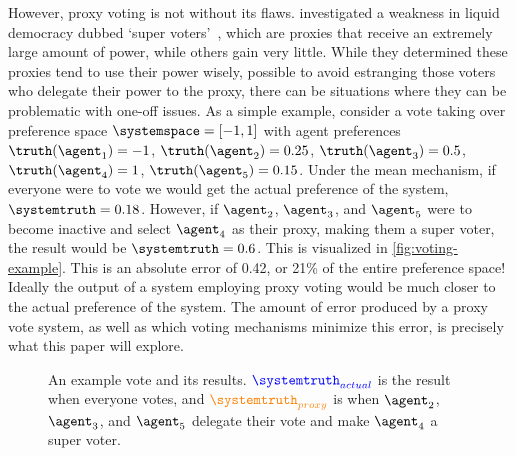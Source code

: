 However, proxy voting is not without its flaws.
 investigated a weakness in liquid democracy dubbed
`super voters'~\cite{Kling2015}, which are proxies that receive an extremely large
amount of power, while others gain very little.
While they determined these proxies tend to use their power wisely, possible  to avoid
estranging those voters who delegate their power to the proxy, there can be
situations where they  can be problematic with one-off issues.
As a simple example, consider a vote taking over preference
space $\systemspace = [-1, 1]$ with agent preferences $\truthof{\agent_1} = -1$,
$\truthof{\agent_2} = 0.25$, $\truthof{\agent_3} = 0.5$, $\truthof{\agent_4} = 1$,
$\truthof{\agent_5} = 0.15$.
Under the mean mechanism, if everyone were to vote
we would get the actual preference of the system, $\systemtruth = 0.18$.
However, if $\agent_2$, $\agent_3$, and $\agent_5$ were to become inactive and select
$\agent_4$ as their proxy, making them a super voter, the result would be
$\systemtruth = 0.6$.
This is visualized in \autoref{fig:voting-example}.
This is an absolute error of 0.42, or 21\% of the entire preference space!
Ideally the output of a system employing proxy voting would be much closer to the
actual preference of the system.
The amount of error produced by a proxy vote system, as well as which voting
mechanisms minimize this error, is precisely what this paper will explore.

\begin{figure}[htbp]
    \centering
    
    \caption{
        An example vote and its results.
        $\textcolor{blue}{\systemtruth_{actual}}$ is the result when everyone votes,
        and $\textcolor{orange}{\systemtruth_{proxy}}$ is when $\agent_2$, $\agent_3$,
        and $\agent_5$ delegate their vote and make $\agent_4$ a super voter.
    }
    \label{fig:voting-example}
\end{figure}





